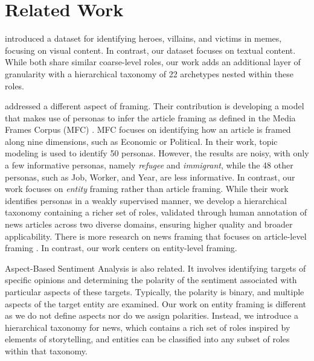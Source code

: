 \section{Related Work\label{sec:related_work}
}

\citet{sharma-etal-2023-characterizing} introduced a dataset for identifying heroes, villains, and victims in memes, focusing on visual content. In contrast, our dataset focuses on textual content. While both share similar coarse-level roles, our work adds an additional layer of granularity with a hierarchical taxonomy of 22 archetypes nested within these roles. 

\citet{card-etal-2016-analyzing} addressed a different aspect of framing. Their contribution is developing a model that makes use of personas to infer the article framing as defined in the Media Frames Corpus (MFC)  \cite{card-etal-2015-media}. MFC focuses on identifying how an article is framed along nine dimensions, such as Economic or Political. In their work, topic modeling is used to identify 50 personas. However, the results are noisy, with only a few informative personas, namely \emph{refugee} and \emph{immigrant}, while the 48 other personas, such as Job, Worker, and Year, are less informative. In contrast, our work focuses on \emph{entity} framing rather than article framing. While their work identifies personas in a weakly supervised manner, we develop a hierarchical taxonomy containing a richer set of roles, validated through human annotation of news articles across two diverse domains, ensuring higher quality and broader applicability. There is more research on news framing that focuses on article-level framing \cite{Pastorino2024DecodingNN, DBLP:conf/acl/0001KF24, piskorski-etal-2023-multilingual, liu-etal-2019-detecting, card-etal-2015-media}. In contrast, our work centers on entity-level framing.

Aspect-Based Sentiment Analysis \cite{chebolu-etal-2024-oats, DBLP:journals/corr/abs-2203-01054, orbach-etal-2021-yaso, jiang-etal-2019-challenge, saeidi-etal-2016-sentihood} is also related. It involves identifying targets of specific opinions and determining the polarity of the sentiment associated with particular aspects of these targets. Typically, the polarity is binary, and multiple aspects of the target entity are examined. Our work on entity framing is different as we do not define aspects nor do we assign polarities. Instead, we introduce a hierarchical taxonomy for news, which contains a rich set of roles inspired by elements of storytelling, and entities can be classified into any subset of roles within that taxonomy.
